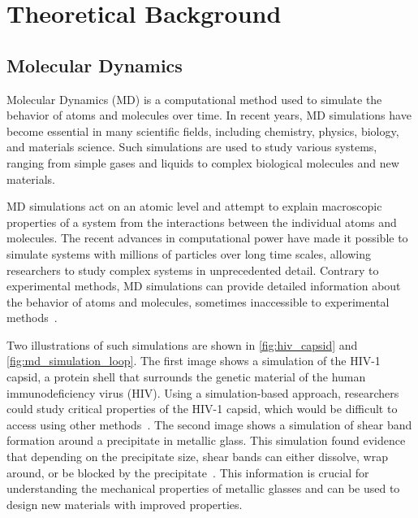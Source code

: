 \chapter{Theoretical Background}
\label{sec:theoretical_background}


\section{Molecular Dynamics}

Molecular Dynamics (MD) is a computational method used to simulate the behavior of atoms and molecules over time. In recent years, MD simulations have become essential in many scientific fields, including chemistry, physics, biology, and materials science. Such simulations are used to study various systems, ranging from simple gases and liquids to complex biological molecules and new materials.

MD simulations act on an atomic level and attempt to explain macroscopic properties of a system from the interactions between the individual atoms and molecules. The recent advances in computational power have made it possible to simulate systems with millions of particles over long time scales, allowing researchers to study complex systems in unprecedented detail. Contrary to experimental methods, MD simulations can provide detailed information about the behavior of atoms and molecules, sometimes inaccessible to experimental methods~\cite{Perilla2017}.

Two illustrations of such simulations are shown in \autoref{fig:hiv_capsid} and \autoref{fig:md_simulation_loop}. The first image shows a simulation of the HIV-1 capsid, a protein shell that surrounds the genetic material of the human immunodeficiency virus (HIV). Using a simulation-based approach, researchers could study critical properties of the HIV-1 capsid, which would be difficult to access using other methods~\cite{Perilla2017}. The second image shows a simulation of shear band formation around a precipitate in metallic glass. This simulation found evidence that depending on the precipitate size, shear bands can either dissolve, wrap around, or be blocked by the precipitate~\cite{Brink2016}. This information is crucial for understanding the mechanical properties of metallic glasses and can be used to design new materials with improved properties.


